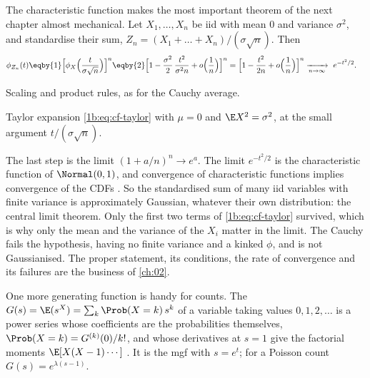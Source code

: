The characteristic function makes the most important theorem of the next
chapter almost mechanical. Let $X_1,\dots,X_n$ be iid with mean $0$ and variance
$\sigma^2$, and standardise their sum, $Z_n=(X_1+\dots+X_n)/(\sigma\sqrt n)$.
Then
\begin{align*}
  \phi_{Z_n}(t)
  &\eqby{1} \Bigl[\phi_X\Bigl(\frac{t}{\sigma\sqrt n}\Bigr)\Bigr]^n
   \eqby{2} \Bigl[1-\frac{\sigma^2}{2}\,\frac{t^2}{\sigma^2n}+o\Bigl(\frac1n\Bigr)\Bigr]^n
   = \Bigl[1-\frac{t^2}{2n}+o\Bigl(\frac1n\Bigr)\Bigr]^n
   \xrightarrow[n\to\infty]{}\ e^{-t^2/2} .
\end{align*}
\begin{explain}
  \item Scaling and product rules, as for the Cauchy average.
  \item Taylor expansion \eqref{1b:eq:cf-taylor} with $\mu=0$ and
        $\E X^2=\sigma^2$, at the small argument $t/(\sigma\sqrt n)$.
\end{explain}
The last step is the limit $(1+a/n)^n\to e^a$. The limit $e^{-t^2/2}$ is the
characteristic function of $\Normal(0,1)$, and convergence of characteristic
functions implies convergence of the CDFs .
So the standardised sum of many iid variables with finite variance is
approximately Gaussian, whatever their own distribution: the central limit
theorem. Only the first two terms of \eqref{1b:eq:cf-taylor} survived, which
is why only the mean and the variance of the $X_i$ matter in the limit. The
Cauchy fails the hypothesis, having no finite variance and a kinked
$\phi$, and is not Gaussianised. The proper statement, its conditions, the
rate of convergence and its failures are the business of \cref{ch:02}.

One more generating function is handy for counts. The
 $G(s)=\E(s^X)=\sum_k\Prob(X=k)\,s^k$
of a variable taking values $0,1,2,\dots$ is a power series whose coefficients
are the probabilities themselves, $\Prob(X=k)=G^{(k)}(0)/k!$, and whose
derivatives at $s=1$ give the factorial moments $\E[X(X-1)\cdots]$
. It is the mgf with $s=e^t$; for a Poisson
count $G(s)=e^{\lambda(s-1)}$.

